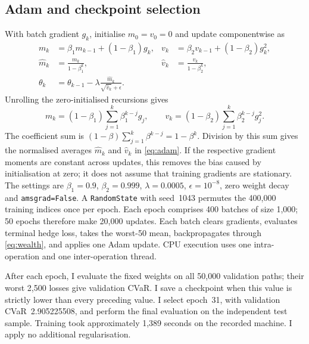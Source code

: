 \documentclass[11pt,a4paper]{article}
\theoremstyle{remark}
\begin{document}
\subsection{Adam and checkpoint selection}
With batch gradient $g_k$, initialise $m_0=v_0=0$ and update componentwise as
\begin{align}
 m_k&=\beta_1m_{k-1}+(1-\beta_1)g_k,&
 v_k&=\beta_2v_{k-1}+(1-\beta_2)g_k^2,\nonumber\\
 \widehat m_k&=\frac{m_k}{1-\beta_1^k},&
 \widehat v_k&=\frac{v_k}{1-\beta_2^k},\nonumber\\
 \theta_k&=\theta_{k-1}-\lambda
          \frac{\widehat m_k}{\sqrt{\widehat v_k}+\epsilon}.
 \label{eq:adam}
\end{align}
Unrolling the zero-initialised recursions gives
\begin{equation}
 m_k=(1-\beta_1)\sum_{j=1}^k\beta_1^{k-j}g_j,
 \qquad v_k=(1-\beta_2)\sum_{j=1}^k\beta_2^{k-j}g_j^2.
\end{equation}
The coefficient sum is $(1-\beta)\sum_{j=1}^k\beta^{k-j}=1-\beta^k$. Division by this sum gives the normalised averages $\widehat m_k$ and $\widehat v_k$ in \eqref{eq:adam}. If the respective gradient moments are constant across updates, this removes the bias caused by initialisation at zero; it does not assume that training gradients are stationary.
The settings are $\beta_1=0.9$, $\beta_2=0.999$, $\lambda=0.0005$, $\epsilon=10^{-8}$, zero weight decay and \texttt{amsgrad=False}. A \texttt{RandomState} with seed~1043 permutes the 400,000 training indices once per epoch. Each epoch comprises 400 batches of size 1,000; 50 epochs therefore make 20,000 updates. Each batch clears gradients, evaluates terminal hedge loss, takes the worst-50 mean, backpropagates through \eqref{eq:wealth}, and applies one Adam update. CPU execution uses one intra-operation and one inter-operation thread.

After each epoch, I evaluate the fixed weights on all 50,000 validation paths; their worst 2,500 losses give validation CVaR. I save a checkpoint when this value is strictly lower than every preceding value. I select epoch~31, with validation CVaR~2.905225508, and perform the final evaluation on the independent test sample. Training took approximately 1,389 seconds on the recorded machine. I apply no additional regularisation.
\end{document}
